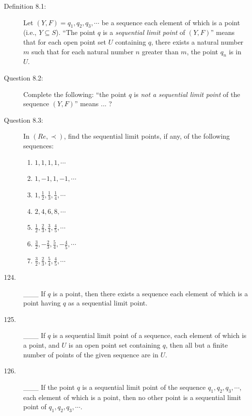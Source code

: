 \documentclass{book}
\begin{document}
\begin{description}

\item[Definition 8.1:] Let $(Y,F) = q_{1}, q_{2}, q_{3}, \cdots$ be a sequence each element of which is a point (i.e., $Y \subseteq S$). ``The point $q$ is a \emph{sequential limit point} of $(Y,F)$'' means that for each open point set $U$ containing $q$, there exists a natural number $m$ such that for each natural number $n$ greater than $m$, the point $q_{n}$ is in $U$.

\item[Question 8.2:] Complete the following: ``the point $q$ is \emph{not a sequential limit point} of the sequence $(Y,F)$'' means ... ?

\item[Question 8.3:] In $(Re, \prec)$, find the sequential limit points, if any, of the following sequences:
\begin{enumerate}[\hspace{1cm}(a)]
  \item $1, 1, 1, 1, \cdots$ 
  \item $1, -1, 1, -1, \cdots$ 
  \item $1, \frac{1}{2}, \frac{1}{3}, \frac{1}{4}, \cdots$ 
  \item $2, 4, 6, 8, \cdots$
  \item $\frac{1}{2}, \frac{2}{3}, \frac{3}{4}, \frac{4}{5}, \cdots$
  \item $\frac{3}{2}, -\frac{2}{3}, \frac{5}{4}, -\frac{4}{5}, \cdots$
  \item $\frac{3}{2}, \frac{2}{3}, \frac{5}{4}, \frac{4}{5}, \cdots$
\end{enumerate}

\item[124.] \_\_\_ If $q$ is a point, then there exists a sequence each element of which is a point having $q$ as a sequential limit point.

\item[125.] \_\_\_ If $q$ is a sequential limit point of a sequence, each element of which is a point, and $U$ is an open point set containing $q$, then all but a finite number of points of the given sequence are in $U$.

\item[126.] \_\_\_ If the point $q$ is a sequential limit point of the sequence $q_{1}, q_{2}, q_{3}, \cdots$, each element of which is a point, then no other point is a sequential limit point of $q_{1}, q_{2}, q_{3}, \cdots$.


\end{description}
\end{document}
